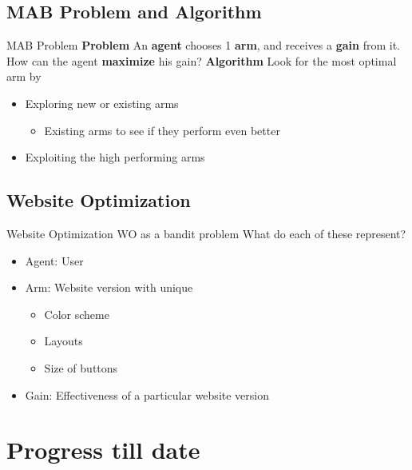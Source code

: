 \documentclass{beamer}
\begin{document}
\subsection{MAB Problem and Algorithm}
\begin{frame}{MAB Problem}
\textbf{Problem}
\newline An \textbf{agent} chooses 1 \textbf{arm}, and receives a \textbf{gain} from it.
\newline How can the agent \textbf{maximize} his gain?
\newline
\newline \textbf{Algorithm}
\newline Look for the most optimal arm by
\begin{itemize}
  \item Exploring new or existing arms
	\begin{itemize}
		\item Existing arms to see if they perform even better
	\end{itemize}
  \item Exploiting the high performing arms
\end{itemize}
\end{frame}

\subsection{Website Optimization}
\begin{frame}{Website Optimization}
WO as a bandit problem
\newline
\newline What do each of these represent?
\begin{itemize}
  \item Agent: User
  \item Arm: Website version with unique
	\begin{itemize}
		\item Color scheme
		\item Layouts
		\item Size of buttons
	\end{itemize}
  \item Gain: Effectiveness of a particular website version
\end{itemize}
\end{frame}

\section{Progress till date}
\end{document}
